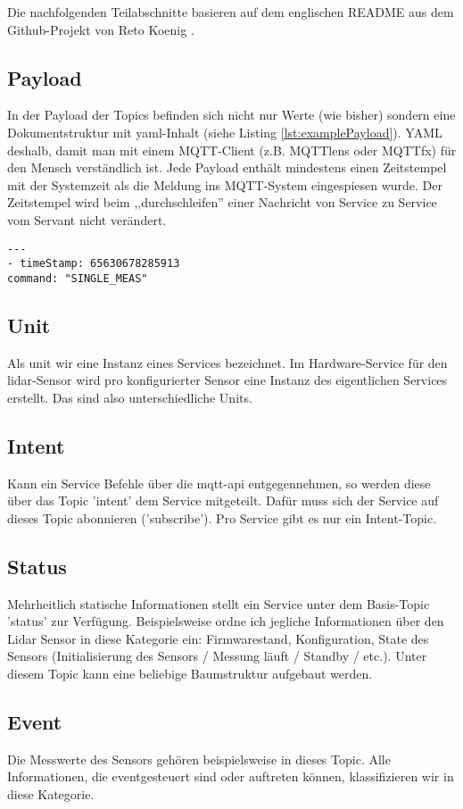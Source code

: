 Die nachfolgenden Teilabschnitte basieren auf dem englischen README aus dem Github-Projekt von Reto Koenig \cite{ch.quantasy.mqtt.gateway}.
\subsection{Payload}
In der Payload der Topics befinden sich nicht nur Werte (wie bisher) sondern eine Dokumentstruktur mit \acrshort{yaml}-Inhalt (siehe Listing \ref{lst:examplePayload}). YAML deshalb, damit man mit einem MQTT-Client (z.B. MQTTlens\cite{mqtt-lens} oder MQTTfx\cite{mqttfx}) für den Mensch verständlich ist. Jede Payload enthält mindestens einen Zeitstempel mit der Systemzeit als die Meldung ins MQTT-System eingespiesen wurde. Der Zeitstempel wird beim ,,durchschleifen'' einer Nachricht von Service zu Service vom Servant nicht verändert. 

\begin{lstlisting}[caption={Beispiel einer MQTT-Payload}, label={lst:examplePayload}]
---
- timeStamp: 65630678285913
command: "SINGLE_MEAS"
\end{lstlisting}

\subsection{Unit}
Als \gls{unit} wir eine Instanz eines Services bezeichnet. Im Hardware-Service für den \acrshort{lidar}-Sensor wird pro konfigurierter Sensor eine Instanz des eigentlichen Services erstellt. Das sind also unterschiedliche Units.
\subsection{Intent}
Kann ein Service Befehle über die \acrshort{mqtt}-\acrshort{api} entgegennehmen, so werden diese über das Topic '\gls{intent}' dem Service mitgeteilt. Dafür muss sich der Service auf dieses Topic abonnieren ('subscribe'). Pro Service gibt es nur ein Intent-Topic.
\subsection{Status}
Mehrheitlich statische Informationen stellt ein Service unter dem Basis-Topic '\gls{status}' zur Verfügung. Beispielsweise ordne ich jegliche Informationen über den Lidar Sensor in diese Kategorie ein: Firmwarestand, Konfiguration, State des Sensors (Initialisierung des Sensors / Messung läuft / Standby / etc.). Unter diesem Topic kann eine beliebige Baumstruktur aufgebaut werden.
\subsection{Event}
Die Messwerte des Sensors gehören beispielsweise in dieses Topic. Alle Informationen, die eventgesteuert sind oder auftreten können, klassifizieren wir in diese Kategorie.
